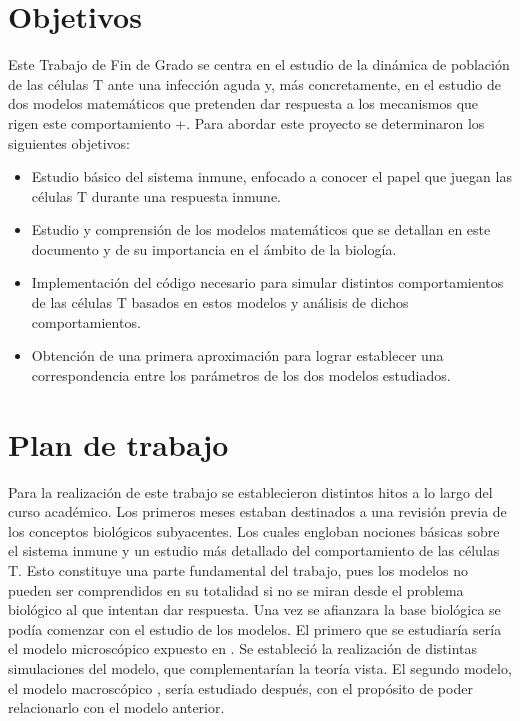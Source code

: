 \section{Objetivos}

Este Trabajo de Fin de Grado se centra en el estudio de la dinámica de población de las células T ante una infección aguda y, más concretamente, en el estudio de dos modelos matemáticos que pretenden dar respuesta a los mecanismos que rigen este comportamiento
+. Para abordar este proyecto se determinaron los siguientes objetivos:

 \begin{itemize}
 	
	\item Estudio básico del sistema inmune, enfocado a conocer el papel que juegan las células T durante una respuesta inmune.
	
	\item Estudio y comprensión de los modelos matemáticos que se detallan en este documento y de su importancia en el ámbito de la biología.
	
 	\item Implementación del código necesario para simular distintos comportamientos de las células T basados en estos modelos y análisis de dichos comportamientos. 
 	
 	\item Obtención de una primera aproximación para lograr establecer una correspondencia entre los parámetros de los dos modelos estudiados. 
 \end{itemize}


\section{Plan de trabajo}

Para la realización de este trabajo se establecieron distintos hitos a lo largo del curso académico. Los primeros meses estaban destinados a una revisión previa de los conceptos biológicos subyacentes. Los cuales engloban nociones básicas sobre el sistema inmune y un estudio más detallado del comportamiento de las células T. Esto constituye una parte fundamental del trabajo, pues los modelos no pueden ser comprendidos en su totalidad si no se miran desde el problema biológico al que intentan dar respuesta. Una vez se afianzara la base biológica se podía comenzar con el estudio de los modelos. El primero que se estudiaría sería el modelo microscópico expuesto en \cite{JTB}. Se estableció la realización de distintas simulaciones del modelo, que complementarían la teoría vista. El segundo modelo, el modelo macroscópico \citep{arias2015growth}, sería estudiado después, con el propósito de poder relacionarlo con el modelo anterior. 


